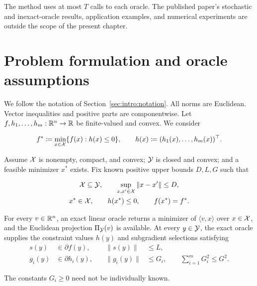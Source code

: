 The method uses at most $T$ calls to each oracle.
The published paper's stochastic and inexact-oracle results,
application examples, and numerical experiments are outside the scope of
the present chapter.

\section{Problem formulation and oracle assumptions}
\label{sec:ch4-assumptions}

We follow the notation of Section~\ref{sec:intro:notation}. All norms are
Euclidean. Vector inequalities and positive parts are componentwise. Let
$f,h_1,\ldots,h_m:\mathbb{R}^n\to\mathbb{R}$ be finite-valued and convex. We consider

\begin{equation}\label{eq:ch4-cb-problem}
f^*\coloneqq\min_{x\in\mathcal{X}}\{f(x):h(x)\le0\},
\qquad h(x)\coloneqq(h_1(x),\ldots,h_m(x))^\top.
\end{equation}

\begin{Thm:Assumption}\label{ass:ch2-oracles}
Assume $\mathcal{X}$ is nonempty, compact, and convex; $\mathcal{Y}$ is closed and convex; and a feasible minimizer $x^*$ exists. Fix known positive upper bounds $D,L,G$ such that

\begin{equation}\label{eq:ch4-cb-domain}
\begin{gathered}
\mathcal{X}\subseteq\mathcal{Y},\qquad \sup_{x,x'\in\mathcal{X}}\|x-x'\|\le D,\\
x^*\in\mathcal{X},\qquad h(x^*)\le0,\qquad f(x^*)=f^*.
\end{gathered}
\end{equation}

For every $v\in\mathbb{R}^n$, an exact linear oracle returns a minimizer of
$\langle v,x\rangle$ over $x\in\mathcal{X}$, and the Euclidean projection
$\Pi_{\mathcal{Y}}(v)$ is available.
At every $y\in\mathcal{Y}$, the exact oracle supplies the constraint values $h(y)$
and subgradient selections satisfying
\begin{equation}\label{eq:ch4-cb-oracles}
\begin{aligned}
s(y)&\in\partial f(y),&\quad \|s(y)\|&\le L,\\
g_i(y)&\in\partial h_i(y),&\quad \|g_i(y)\|&\le G_i,
\qquad \sum_{i=1}^mG_i^2\le G^2.
\end{aligned}
\end{equation}

The constants $G_i\ge0$ need not be individually known.
\end{Thm:Assumption}

